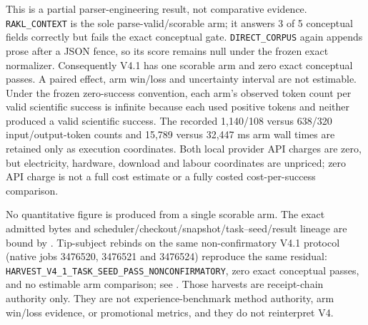 This is a partial parser-engineering result, not comparative evidence.
\texttt{RAKL\_CONTEXT} is the sole parse-valid/scorable arm; it answers 3 of 5
conceptual fields correctly but fails the exact conceptual gate.
\texttt{DIRECT\_CORPUS} again appends prose after a JSON fence, so its score
remains null under the frozen exact normalizer.  Consequently V4.1 has one
scorable arm and zero exact conceptual passes.  A paired effect, arm win/loss
and uncertainty interval are not estimable.  Under the frozen zero-success
convention, each arm's observed token count per valid scientific success is
infinite because each used positive tokens and neither produced a valid
scientific success.  The recorded
1,140/108 versus 638/320 input/output-token counts and 15,789 versus 32,447 ms
arm wall times are retained only as execution coordinates.  Both local provider
API charges are zero, but electricity, hardware, download and labour coordinates
are unpriced; zero API charge is not a full cost estimate or a fully costed
cost-per-success comparison.

No quantitative figure is produced from a single scorable arm.  The exact
admitted bytes and scheduler/checkout/snapshot/task--seed/result lineage are
bound by
.
Tip-subject rebinds on the same non-confirmatory V4.1 protocol
(native jobs 3476520, 3476521 and 3476524) reproduce the same residual:
\texttt{HARVEST\_V4\_1\_TASK\_SEED\_PASS\_NONCONFIRMATORY}, zero exact
conceptual passes, and no estimable arm comparison; see
.
Those harvests are receipt-chain authority only.  They are not
experience-benchmark method authority, arm win/loss evidence, or
promotional metrics, and they do not reinterpret V4.

